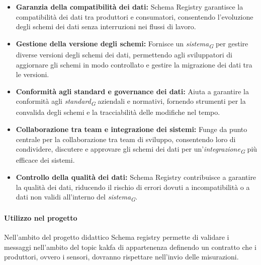 \begin{itemize}
\item \textbf{Garanzia della compatibilità dei dati:} Schema Registry garantisce la compatibilità dei dati tra produttori e consumatori, consentendo l'evoluzione degli schemi dei dati senza interruzioni nei flussi di lavoro.

\item \textbf{Gestione della versione degli schemi:} Fornisce un \textit{sistema}\textsubscript{\textit{G}} per gestire diverse versioni degli schemi dei dati, permettendo agli sviluppatori di aggiornare gli schemi in modo controllato e gestire la migrazione dei dati tra le versioni.

\item \textbf{Conformità agli standard e governance dei dati:} Aiuta a garantire la conformità agli \textit{standard}\textsubscript{\textit{G}} aziendali e normativi, fornendo strumenti per la convalida degli schemi e la tracciabilità delle modifiche nel tempo.

\item \textbf{Collaborazione tra team e integrazione dei sistemi:} Funge da punto centrale per la collaborazione tra team di sviluppo, consentendo loro di condividere, discutere e approvare gli schemi dei dati per un'\textit{integrazione}\textsubscript{\textit{G}} più efficace dei sistemi.

\item \textbf{Controllo della qualità dei dati:} Schema Registry contribuisce a garantire la qualità dei dati, riducendo il rischio di errori dovuti a incompatibilità o a dati non validi all'interno del \textit{sistema}\textsubscript{\textit{G}}.
\end{itemize}


\paragraph{Utilizzo nel progetto}
Nell'ambito del progetto didattico Schema registry permette di validare i messaggi nell'ambito del topic kakfa di appartenenza definendo un contratto che i produttori, ovvero i sensori, dovranno rispettare nell'invio delle misurazioni.